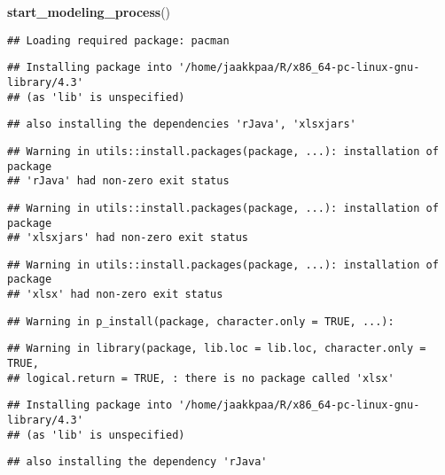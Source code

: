\documentclass[
]{article}
\newenvironment{Shaded}{\begin{snugshade}}{\end{snugshade}}
\newcommand{\FunctionTok}[1]{\textcolor[rgb]{0.13,0.29,0.53}{\textbf{#1}}}
\newcommand{\NormalTok}[1]{#1}
\begin{document}
\begin{Shaded}
\begin{Highlighting}[]
\FunctionTok{start\_modeling\_process}\NormalTok{()}
\end{Highlighting}
\end{Shaded}

\begin{verbatim}
## Loading required package: pacman
\end{verbatim}

\begin{verbatim}
## Installing package into '/home/jaakkpaa/R/x86_64-pc-linux-gnu-library/4.3'
## (as 'lib' is unspecified)
\end{verbatim}

\begin{verbatim}
## also installing the dependencies 'rJava', 'xlsxjars'
\end{verbatim}

\begin{verbatim}
## Warning in utils::install.packages(package, ...): installation of package
## 'rJava' had non-zero exit status
\end{verbatim}

\begin{verbatim}
## Warning in utils::install.packages(package, ...): installation of package
## 'xlsxjars' had non-zero exit status
\end{verbatim}

\begin{verbatim}
## Warning in utils::install.packages(package, ...): installation of package
## 'xlsx' had non-zero exit status
\end{verbatim}

\begin{verbatim}
## Warning in p_install(package, character.only = TRUE, ...):
\end{verbatim}

\begin{verbatim}
## Warning in library(package, lib.loc = lib.loc, character.only = TRUE,
## logical.return = TRUE, : there is no package called 'xlsx'
\end{verbatim}

\begin{verbatim}
## Installing package into '/home/jaakkpaa/R/x86_64-pc-linux-gnu-library/4.3'
## (as 'lib' is unspecified)
\end{verbatim}

\begin{verbatim}
## also installing the dependency 'rJava'
\end{verbatim}
\end{document}
